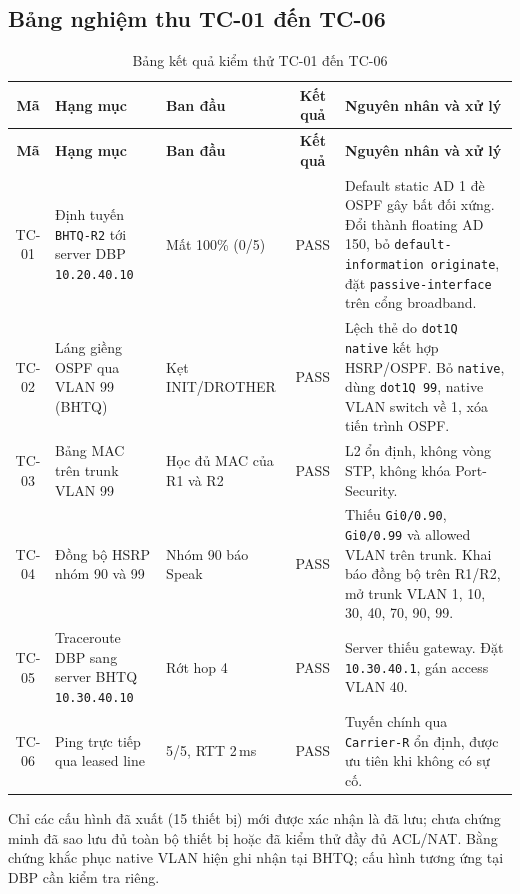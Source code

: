 \subsection{Bảng nghiệm thu TC-01 đến TC-06}
\begin{small}
\setlength{\tabcolsep}{3pt}
\begin{longtable}{|c|p{2.5cm}|p{2.2cm}|c|p{5.4cm}|}
\caption{Bảng kết quả kiểm thử TC-01 đến TC-06} \label{tab:test_matrix} \\
\hline
\textbf{Mã} & \textbf{Hạng mục} & \textbf{Ban đầu} & \textbf{Kết quả} & \textbf{Nguyên nhân và xử lý} \\ \hline
\endfirsthead
\hline \textbf{Mã} & \textbf{Hạng mục} & \textbf{Ban đầu} & \textbf{Kết quả} & \textbf{Nguyên nhân và xử lý} \\ \hline
\endhead
TC-01 & Định tuyến \texttt{BHTQ-R2} tới server DBP \texttt{10.20.40.10} & Mất 100\% (0/5) & PASS & Default static AD 1 đè OSPF gây bất đối xứng. Đổi thành floating AD 150, bỏ \texttt{default-information originate}, đặt \texttt{passive-interface} trên cổng broadband. \\ \hline
TC-02 & Láng giềng OSPF qua VLAN 99 (BHTQ) & Kẹt INIT/DROTHER & PASS & Lệch thẻ do \texttt{dot1Q native} kết hợp HSRP/OSPF. Bỏ \texttt{native}, dùng \texttt{dot1Q 99}, native VLAN switch về 1, xóa tiến trình OSPF. \\ \hline
TC-03 & Bảng MAC trên trunk VLAN 99 & Học đủ MAC của R1 và R2 & PASS & L2 ổn định, không vòng STP, không khóa Port-Security. \\ \hline
TC-04 & Đồng bộ HSRP nhóm 90 và 99 & Nhóm 90 báo Speak & PASS & Thiếu \texttt{Gi0/0.90}, \texttt{Gi0/0.99} và allowed VLAN trên trunk. Khai báo đồng bộ trên R1/R2, mở trunk VLAN 1, 10, 30, 40, 70, 90, 99. \\ \hline
TC-05 & Traceroute DBP sang server BHTQ \texttt{10.30.40.10} & Rớt hop 4 & PASS & Server thiếu gateway. Đặt \texttt{10.30.40.1}, gán access VLAN 40. \\ \hline
TC-06 & Ping trực tiếp qua leased line & 5/5, RTT 2\,ms & PASS & Tuyến chính qua \texttt{Carrier-R} ổn định, được ưu tiên khi không có sự cố. \\ \hline
\end{longtable}
\end{small}
\noindent Chỉ các cấu hình đã xuất (15 thiết bị) mới được xác nhận là đã lưu; chưa chứng minh đã sao lưu đủ toàn bộ thiết bị hoặc đã kiểm thử đầy đủ ACL/NAT. Bằng chứng khắc phục native VLAN hiện ghi nhận tại BHTQ; cấu hình tương ứng tại DBP cần kiểm tra riêng.

